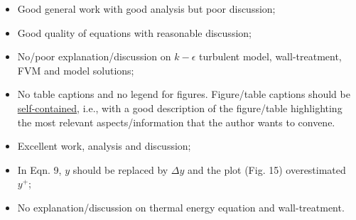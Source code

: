 \documentclass[14pt,twoside]{report}
\newcommand\blankpage{%
    \null
    \thispagestyle{empty}%
    \addtocounter{page}{-1}%
    \newpage}
\begin{document}
\clearpage 





\bigskip


\medskip

  \begin{itemize}
%
     \item Good general work with good analysis but poor discussion;
     \item Good quality of equations with reasonable discussion;
     \item No/poor explanation/discussion on $k-\epsilon$ turbulent model, wall-treatment, FVM and model solutions;
     \item No table captions and no legend for figures. Figure/table captions should be \underline{self-contained}, i.e., with a good description of the figure/table highlighting the most relevant aspects/information that the author wants to convene.
%
  \end{itemize}%

\clearpage 

\vspace{20cm}

\clearpage 




\bigskip


\medskip

  \begin{itemize}
%
     \item Excellent work, analysis and discussion;
     \item In Eqn. 9, $y$ should be replaced by $\Delta y$ and the plot (Fig. 15) overestimated $y^{+}$; 
     \item No explanation/discussion on thermal energy equation and wall-treatment.
%
  \end{itemize}%

\clearpage 


\end{document}
